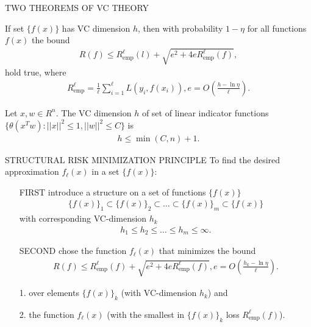 \documentclass[11pt]{beamer}
\begin{document}
\begin{frame}{TWO THEOREMS OF VC THEORY}
\begin{theorem}
If set $\{f(x)\}$ has VC dimension $h$, then with probability $1-\eta$ for all functions $f(x)$ the bound
\begin{align*}
R(f) \leq R_{\text{emp}}^{\ell}(l) + \sqrt{e^{2} + 4eR_{\text{emp}}^{\ell}(f)},
\end{align*}
hold true, where
\begin{align*}
R_{\text{emp}}^{\ell} = \frac{1}{\ell}\sum_{i=1}^{\ell}L(y_{i}, f(x_{i})), e = O\left(\frac{h - \ln \eta}{\ell}\right).
\end{align*}
\end{theorem}


\begin{theorem}
Let $x, w \in R^{n}$. The VC dimension $h$ of set of linear indicator functions $\{\theta(x^{T}w): ||x||^{2} \leq 1, ||w||^{2} \leq C\}$ is 
\begin{align*}
h \leq \min(C, n) + 1.
\end{align*}
\end{theorem}
\end{frame}

\begin{frame}{STRUCTURAL RISK MINIMIZATION PRINCIPLE}
To find the desired approximation $f_{\ell}(x)$ in a set $\{f(x)\}$:
\begin{enumerate}
\item[FIRST] introduce a structure on a set of functions $\{f(x)\}$
\begin{align*}
\{f(x)\}_{1} \subset \{f(x)\}_{2} \subset \ldots \subset \{f(x)\}_{m} \subset \{f(x)\}
\end{align*} 
with corresponding VC-dimension $h_{k}$
\begin{align*}
h_{1} \leq h_{2} \leq \ldots \leq h_{m} \leq \infty.
\end{align*}
\item[SECOND] chose the function $f_{\ell}(x)$ that minimizes the bound
\begin{align*}
R(f) \leq R_{\text{emp}}^{\ell}(f) + \sqrt{e^{2} + 4eR_{\text{emp}}^{\ell}(f)}, e = O\left(\frac{h_{k} - \ln \eta}{\ell}\right).
\end{align*}
\end{enumerate}
\begin{enumerate}
\item[1.] over elements $\{f(x)\}_{k}$ (with VC-dimension $h_{k}$) and 
\item[2.] the function $f_{\ell}(x)$ (with the smallest in $\{f(x)\}_{k}$ loss $R_{\text{emp}}^{\ell}(f)$).
\end{enumerate}
\end{frame}
\end{document}
